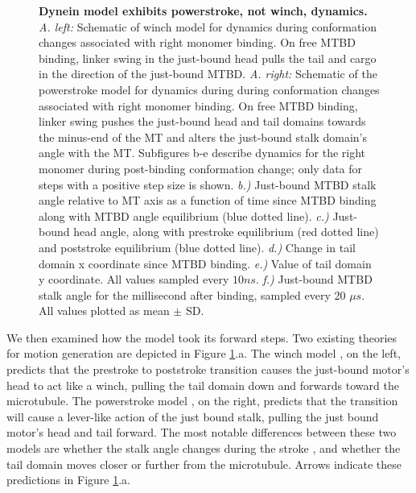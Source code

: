 \documentclass[9pt,twocolumn,twoside]{article}
\begin{document}
\begin{figure}[tbhp]
  \caption{\textbf{Dynein model exhibits powerstroke, not winch, dynamics.} \textit{A. left: } Schematic of winch model for dynamics during conformation changes associated with right monomer binding. On free MTBD binding, linker swing in the just-bound head pulls the tail and cargo in the direction of the just-bound MTBD. \textit{A. right: } Schematic of the powerstroke model for dynamics during during conformation changes associated with right monomer binding. On free MTBD binding, linker swing pushes the just-bound head and tail domains towards the minus-end of the MT and alters the just-bound stalk domain's angle with the MT. Subfigures b-e describe dynamics for the right monomer during post-binding conformation change; only data for steps with a positive step size is shown. \textit{b.) } Just-bound MTBD stalk angle relative to MT axis as a function of time since MTBD binding along with MTBD angle equilibrium (blue dotted line). \textit{c.) } Just-bound head angle, along with prestroke equilibrium (red dotted line) and poststroke equilibrium (blue dotted line). \textit{d.) } Change in tail domain x coordinate since MTBD binding. \textit{e.) } Value of tail domain y coordinate. All values sampled every $10 ns$. \textit{f.) } Just-bound MTBD stalk angle for the millisecond after binding, sampled every 20 $\mu s$. All values plotted as mean $\pm$ SD.}
\label{fig:stroke}
\end{figure}

We then examined how the model took its forward steps. Two existing theories for motion generation are depicted in Figure \ref{fig:stroke}.a. The winch model \cite{carterwinch, uenoem, sarlahmodel, nicastro, kinoshitaPSwinch, lippert}, on the left, predicts that the prestroke to poststroke transition causes the just-bound motor's head to act like a winch, pulling the tail domain down and forwards toward the microtubule. The powerstroke model \cite{mallikps, burgessknight, robertspowerstroke, burgess-paper}, on the right, predicts that the transition will cause a lever-like action of the just bound stalk, pulling the just bound motor's head and tail forward. The most notable differences between these two models are whether the stalk angle changes during the stroke \cite{lippert}, and whether the tail domain moves closer or further from the microtubule. Arrows indicate these predictions in Figure \ref{fig:stroke}.a.
\end{document}
